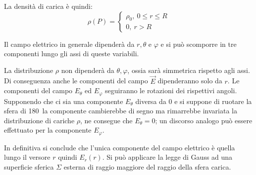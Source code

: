 La densità di carica è quindi:
$$
\rho(P) = 
\begin{cases}
\rho_0,\ 0\leq r\leq R\\
0,\ r > R
\end{cases}
$$

Il campo elettrico in generale dipenderà da $r,\theta$ e $\varphi$ e si può scomporre in 
tre componenti lungo gli assi di queste variabili.

La distribuzione $\rho$ non dipenderà da $\theta,\varphi$, ossia sarà simmetrica rispetto agli assi.
Di conseguenza anche le componenti del campo $\vec{E}$ dipenderanno solo da $r$.
Le componenti del campo $E_\theta$ ed $E_\varphi$ seguiranno le rotazioni dei rispettivi angoli.
Supponendo che ci sia una componente $E_\theta$ diversa da 0 e si suppone di ruotare la sfera di
180\textdegree\ la componente cambierebbe di segno ma rimarrebbe invariata la distribuzione di cariche $\rho$,
ne consegue che $E_\theta = 0$; un discorso analogo può essere effettuato per la componente $E_\varphi$.

In definitiva si conclude che l'unica componente del campo elettrico è quella lungo 
il versore $r$ quindi $E_r(r)$.
Si può applicare la legge di Gauss ad una superficie sferica $\Sigma$ esterna di raggio maggiore del raggio
della sfera carica.

